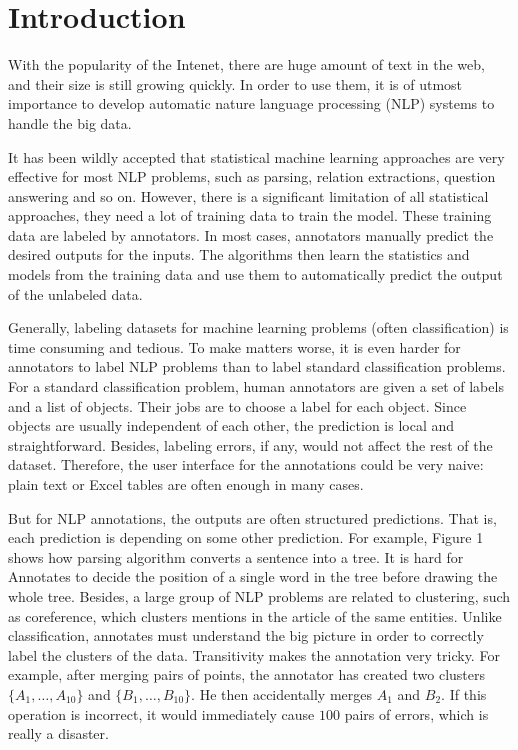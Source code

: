 \section{Introduction}

With the popularity of the Intenet, there are huge amount of text in the web, and their size is still growing quickly. In order to use them, it is of utmost importance to develop automatic nature language processing (NLP) systems to handle the big data. 


It has been wildly accepted that statistical machine learning approaches are very effective for most NLP problems, such as parsing, relation extractions, question answering and so on. However, there is a significant limitation of all statistical approaches, they need a lot of training data to train the model. These training data are labeled by annotators. In most cases, annotators manually predict the desired outputs for the inputs. The algorithms then learn the statistics and models from the training data and use them to automatically predict the output of the unlabeled data.   

Generally, labeling datasets for machine learning problems (often classification) is time consuming and tedious. To make matters worse, it is even harder for annotators to label NLP problems than to label standard classification problems. For a standard classification problem, human annotators are given a set of labels and a list of objects. Their jobs are to choose a label for each object. Since objects are usually independent of each other, the prediction is local and straightforward. Besides, labeling errors, if any, would not affect the rest of the dataset. Therefore, the user interface for the annotations could be very naive: plain text or Excel tables are often enough in many cases. 


But for NLP annotations, the outputs are often structured predictions. That is, each prediction is depending on some other prediction. For example, Figure 1 shows how parsing algorithm converts a sentence into a tree. It is hard for Annotates to decide the position of a single word in the tree before drawing the whole tree. Besides, a large group of NLP problems are related to clustering, such as coreference, which clusters mentions in the article of the same entities. Unlike classification, annotates must understand the big picture in order to correctly label the clusters of the data. Transitivity makes the annotation very tricky. For example, after merging pairs of points, the annotator has created two clusters $\{A_1,\ldots,A_{10}\}$ and $\{B_1,\ldots,B_{10}\}$. He then accidentally merges $A_1$ and $B_2$. If this operation is incorrect, it would immediately cause $100$ pairs of errors, which is really a disaster. 


